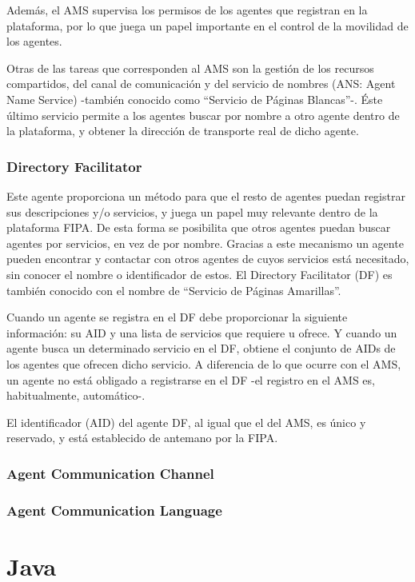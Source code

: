 Además, el AMS supervisa los permisos de los agentes que registran en la
plataforma, por lo que juega un papel importante en el control de la movilidad
de los agentes.

Otras de las tareas que corresponden al AMS son la gestión de los recursos
compartidos, del canal de comunicación y del servicio de nombres (ANS: Agent
Name Service) -también conocido como ``Servicio de Páginas Blancas''-. Éste
último servicio permite a los agentes buscar por nombre a otro agente dentro de
la plataforma, y obtener la dirección de transporte real de dicho agente.

\subsubsection*{Directory Facilitator}

Este agente proporciona un método para que el resto de agentes puedan registrar
sus descripciones y/o servicios, y juega un papel muy relevante dentro de la
plataforma FIPA. De esta forma se posibilita que otros agentes puedan buscar
agentes por servicios, en vez de por nombre. Gracias a este mecanismo un agente
pueden encontrar y contactar con otros agentes de cuyos servicios está
necesitado, sin conocer el nombre o identificador de estos. El Directory
Facilitator (DF) es también conocido con el nombre de ``Servicio de Páginas
Amarillas''.

Cuando un agente se registra en el DF debe proporcionar la siguiente
información: su AID y una lista de servicios que requiere u ofrece. Y cuando un
agente busca un determinado servicio en el DF, obtiene el conjunto de AIDs de
los agentes que ofrecen dicho servicio. A diferencia de lo que ocurre con el
AMS, un agente no está obligado a registrarse en el DF -el registro en el AMS
es, habitualmente, automático-.

El identificador (AID) del agente DF, al igual que el del AMS, es único y
reservado, y está establecido de antemano por la FIPA.

\subsubsection*{Agent Communication Channel}

\subsubsection*{Agent Communication Language}

\section*{Java}

